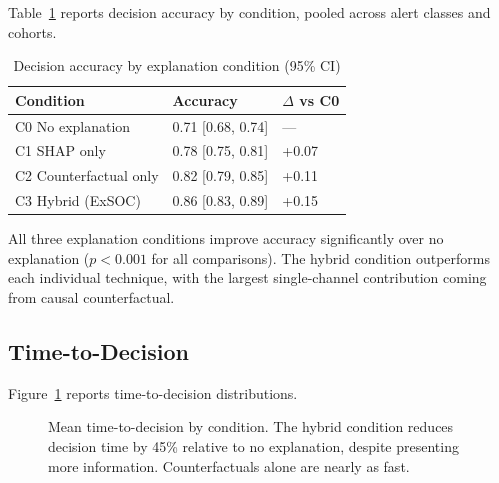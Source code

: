 \documentclass[sigconf,nonacm]{acmart}
\begin{document}
Table~\ref{tab:accuracy} reports decision accuracy by condition, pooled
across alert classes and cohorts.

\begin{table}[h]
\caption{Decision accuracy by explanation condition (95\% CI)}
\label{tab:accuracy}
\small
\begin{tabularx}{\columnwidth}{@{}p{3.0cm}X X@{}}
\toprule
\textbf{Condition} & \textbf{Accuracy} & \textbf{$\Delta$ vs C0} \\
\midrule
C0 No explanation         & 0.71 [0.68, 0.74] & --- \\
C1 SHAP only              & 0.78 [0.75, 0.81] & +0.07 \\
C2 Counterfactual only    & 0.82 [0.79, 0.85] & +0.11 \\
C3 Hybrid (ExSOC)         & 0.86 [0.83, 0.89] & +0.15 \\
\bottomrule
\end{tabularx}
\end{table}

All three explanation conditions improve accuracy significantly over no
explanation ($p < 0.001$ for all comparisons). The hybrid condition
outperforms each individual technique, with the largest single-channel
contribution coming from causal counterfactual.

\subsection{Time-to-Decision}

Figure~\ref{fig:time} reports time-to-decision distributions.

\begin{figure}[h]
\centering
{}
\caption{Mean time-to-decision by condition. The hybrid condition reduces
  decision time by 45\% relative to no explanation, despite presenting more
  information. Counterfactuals alone are nearly as fast.}
\label{fig:time}
\end{figure}
\end{document}
